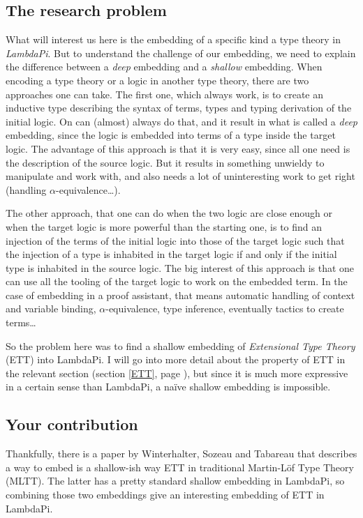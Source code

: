 \subsection*{The research problem}

What will interest us here is the embedding of a specific kind a type theory in
\emph{LambdaPi}. But to understand the challenge of our embedding, we need to
explain the difference between a \emph{deep} embedding and a \emph{shallow}
embedding. When encoding a type theory or a logic in another type theory, there
are two approaches one can take.  The first one, which always work, is to create
an inductive type describing the syntax of terms, types and typing derivation of
the initial logic. On can (almost) always do that, and it result in what is
called a \emph{deep} embedding, since the logic is embedded into terms of a type
inside the target logic.  The advantage of this approach is that it is very
easy, since all one need is the description of the source logic. But it results
in something unwieldy to manipulate and work with, and also needs a lot of
uninteresting work to get right (handling $\alpha$-equivalence\dots).

The other approach, that one can do when the two logic are close enough or when
the target logic is more powerful than the starting one, is to find an injection
of the terms of the initial logic into those of the target logic such that the
injection of a type is inhabited in the target logic if and only if the initial
type is inhabited in the source logic.  The big interest of this approach is
that one can use all the tooling of the target logic to work on the embedded
term. In the case of embedding in a proof assistant, that means automatic
handling of context and variable binding, $\alpha$-equivalence, type inference,
eventually tactics to create terms\dots

So the problem here was to find a shallow embedding of \emph{Extensional Type
Theory} (ETT) into LambdaPi. I will go into more detail about the property of
ETT in the relevant section (section \ref{ETT}, page \pageref{ETT}), but since
it is much more expressive in a certain sense than LambdaPi, a naïve shallow
embedding is impossible.

\thispagestyle{empty}
\subsection*{Your contribution}

Thankfully, there is a paper by Winterhalter, Sozeau and
Tabareau\cite{winterhalter_eliminating_2019} that describes a way to embed is a
shallow-ish way ETT in traditional Martin-Löf Type Theory (MLTT). The latter has a
pretty standard shallow embedding in LambdaPi, so combining those two embeddings
give an interesting embedding of ETT in LambdaPi.

